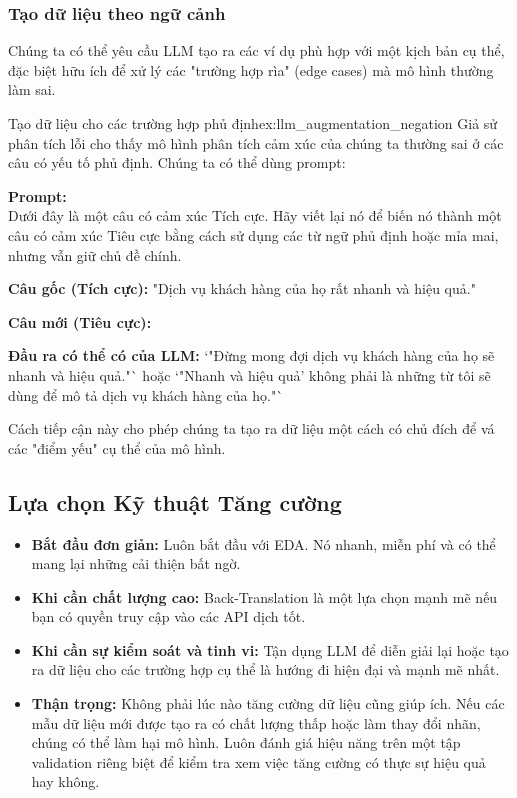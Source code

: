 \subsubsection{Tạo dữ liệu theo ngữ cảnh}
Chúng ta có thể yêu cầu LLM tạo ra các ví dụ phù hợp với một kịch bản cụ thể, đặc biệt hữu ích để xử lý các "trường hợp rìa" (edge cases) mà mô hình thường làm sai.

\begin{example}{Tạo dữ liệu cho các trường hợp phủ định}{ex:llm_augmentation_negation}
    Giả sử phân tích lỗi cho thấy mô hình phân tích cảm xúc của chúng ta thường sai ở các câu có yếu tố phủ định. Chúng ta có thể dùng prompt:
    \begin{tcolorbox}[colback=gray!5!white, colframe=gray!50!black, sharp corners]
    \textbf{Prompt:} \\
    Dưới đây là một câu có cảm xúc Tích cực. Hãy viết lại nó để biến nó thành một câu có cảm xúc Tiêu cực bằng cách sử dụng các từ ngữ phủ định hoặc mỉa mai, nhưng vẫn giữ chủ đề chính.

    \textbf{Câu gốc (Tích cực):} "Dịch vụ khách hàng của họ rất nhanh và hiệu quả."

    \textbf{Câu mới (Tiêu cực):}
    \end{tcolorbox}
    \textbf{Đầu ra có thể có của LLM:} `"Đừng mong đợi dịch vụ khách hàng của họ sẽ nhanh và hiệu quả."` hoặc `"Nhanh và hiệu quả' không phải là những từ tôi sẽ dùng để mô tả dịch vụ khách hàng của họ."`
\end{example}
Cách tiếp cận này cho phép chúng ta tạo ra dữ liệu một cách có chủ đích để vá các "điểm yếu" cụ thể của mô hình.

\subsection{Lựa chọn Kỹ thuật Tăng cường}
\begin{itemize}
    \item \textbf{Bắt đầu đơn giản:} Luôn bắt đầu với EDA. Nó nhanh, miễn phí và có thể mang lại những cải thiện bất ngờ.
    \item \textbf{Khi cần chất lượng cao:} Back-Translation là một lựa chọn mạnh mẽ nếu bạn có quyền truy cập vào các API dịch tốt.
    \item \textbf{Khi cần sự kiểm soát và tinh vi:} Tận dụng LLM để diễn giải lại hoặc tạo ra dữ liệu cho các trường hợp cụ thể là hướng đi hiện đại và mạnh mẽ nhất.
    \item \textbf{Thận trọng:} Không phải lúc nào tăng cường dữ liệu cũng giúp ích. Nếu các mẫu dữ liệu mới được tạo ra có chất lượng thấp hoặc làm thay đổi nhãn, chúng có thể làm hại mô hình. Luôn đánh giá hiệu năng trên một tập validation riêng biệt để kiểm tra xem việc tăng cường có thực sự hiệu quả hay không.
\end{itemize}